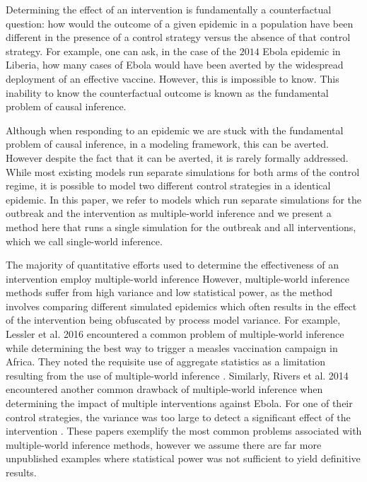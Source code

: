 \documentclass[PTRSB]{rsos}
\begin{document}
Determining the effect of an intervention is fundamentally a counterfactual question: how would the outcome of a given epidemic in a population have been different in the presence of a control strategy versus the absence of that control strategy.
For example, one can ask, in the case of the $2014$ Ebola epidemic in Liberia, how many cases of Ebola would have been averted by the widespread deployment of an effective vaccine.
However, this is impossible to know. 
This inability to know the counterfactual outcome is known as the fundamental problem of causal inference.\cite{holland:1986}

Although when responding to an epidemic we are stuck with the fundamental problem of causal inference, in a modeling framework, this can be averted.
However despite the fact that it can be averted, it is rarely formally addressed. 
While most existing models run separate simulations for both arms of the control regime, it is possible to model two different control strategies in a identical epidemic.
In this paper, we refer to models which run separate simulations for the outbreak and the intervention as multiple-world inference and we present a method here that runs a single simulation for the outbreak and all interventions, which we call single-world inference.

The majority of quantitative efforts used to determine the effectiveness of an intervention employ multiple-world inference \cite{} %
However, multiple-world inference methods suffer from high variance and low statistical power, as the method involves comparing different simulated epidemics which often results in the effect of the intervention being obfuscated by process model variance.
For example, Lessler et al. 2016 encountered a common problem of multiple-world inference while determining the best way to trigger a measles vaccination campaign in Africa. 
They noted the requisite use of aggregate statistics as a limitation resulting from the use of multiple-world inference \cite{lessler-et-al:2016}.
Similarly, Rivers et al. 2014 encountered another common drawback of multiple-world inference when determining the impact of multiple interventions against Ebola.
For one of their control strategies, the variance was too large to detect a significant effect of the intervention \cite{rivers-et-al:2014}.
These papers exemplify the most common problems associated with multiple-world inference methods, however we assume there are far more unpublished examples where statistical power was not sufficient to yield definitive results.
\end{document}
